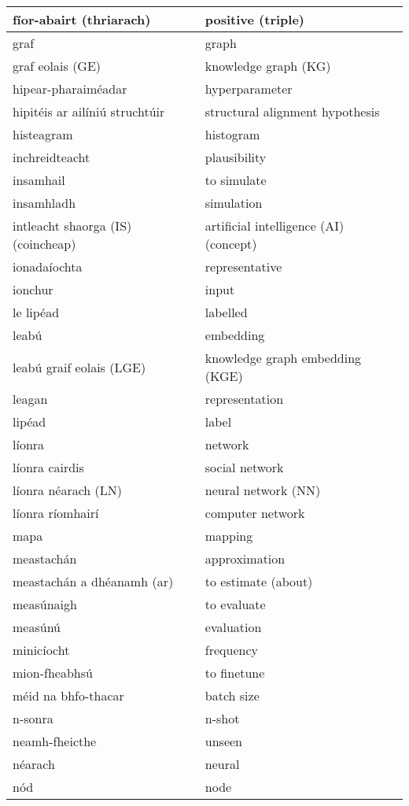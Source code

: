 \documentclass{article}
\begin{document}
\begin{longtable}{|l|l|}
		fíor-abairt (thriarach)&positive (triple)\\ \hline 
		graf&graph\\ \hline 
		graf eolais (GE)&knowledge graph (KG)\\ \hline 
		hipear-pharaiméadar&hyperparameter\\ \hline 
		hipitéis ar ailíniú struchtúir&structural alignment hypothesis\\ \hline 
		histeagram&histogram\\ \hline 
		inchreidteacht&plausibility\\ \hline 
		insamhail&to simulate\\ \hline 
		insamhladh&simulation\\ \hline 
		intleacht shaorga (IS) (coincheap)&artificial intelligence (AI) (concept)\\ \hline 
		ionadaíochta&representative\\ \hline 
		ionchur&input\\ \hline 
		le lipéad&labelled\\ \hline 
		leabú&embedding\\ \hline 
		leabú graif eolais (LGE)&knowledge graph embedding (KGE)\\ \hline 
		leagan&representation\\ \hline 
		lipéad&label\\ \hline 
		líonra&network\\ \hline 
		líonra cairdis&social network\\ \hline 
		líonra néarach (LN)&neural network (NN)\\ \hline 
		líonra ríomhairí&computer network\\ \hline 
		mapa&mapping\\ \hline 
		meastachán&approximation\\ \hline 
		meastachán a dhéanamh (ar)&to estimate (about)\\ \hline 
		measúnaigh&to evaluate\\ \hline 
		measúnú&evaluation\\ \hline 
		minicíocht&frequency\\ \hline 
		mion-fheabhsú&to finetune\\ \hline 
		méid na bhfo-thacar&batch size\\ \hline 
		n-sonra&n-shot\\ \hline 
		neamh-fheicthe&unseen\\ \hline 
		néarach&neural\\ \hline 
		nód&node\\ \hline 

\end{longtable}
\end{document}

